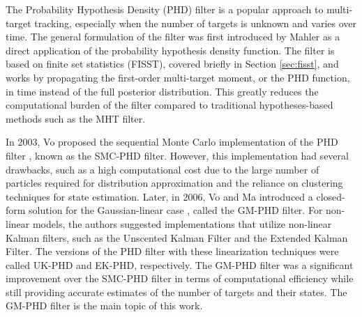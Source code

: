 The Probability Hypothesis Density (PHD) filter is a popular approach to multi-target tracking, especially when the number of targets is unknown and varies over time. The general formulation of the filter was first introduced by Mahler \cite{mahlerMultitargetBayesFiltering2003} as a direct application of the probability hypothesis density function. The filter is based on finite set statistics (FISST), covered briefly in Section \ref{sec:fisst}, and works by propagating the first-order multi-target moment, or the PHD function, in time instead of the full posterior distribution. This greatly reduces the computational burden of the filter compared to traditional hypotheses-based methods such as the MHT filter.

In 2003, Vo proposed the sequential Monte Carlo implementation of the PHD filter \cite{voSequentialMonteCarlo2003}, known as the SMC-PHD filter. However, this implementation had several drawbacks, such as a high computational cost due to the large number of particles required for distribution approximation and the reliance on clustering techniques for state estimation. Later, in 2006, Vo and Ma introduced a closed-form solution for the Gaussian-linear case \cite{voGaussianMixtureProbability2006}, called the GM-PHD filter. For non-linear models, the authors suggested implementations that utilize non-linear Kalman filters, such as the Unscented Kalman Filter and the Extended Kalman Filter. The versions of the PHD filter with these linearization techniques were called UK-PHD and EK-PHD, respectively. The GM-PHD filter was a significant improvement over the SMC-PHD filter in terms of computational efficiency while still providing accurate estimates of the number of targets and their states. The GM-PHD filter is the main topic of this work.

